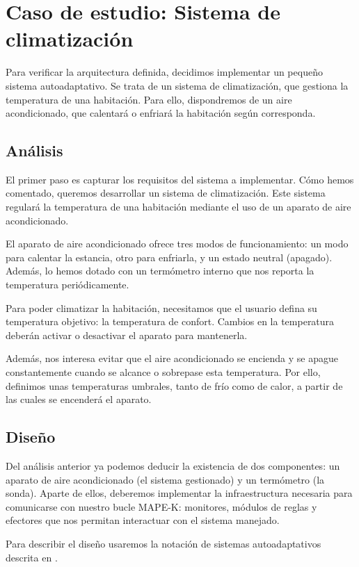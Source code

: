 \chapter{Caso de estudio: Sistema de climatización}
\label{chap:caso_estudio}

Para verificar la arquitectura definida, decidimos implementar un pequeño sistema autoadaptativo. Se trata de un sistema de climatización, que gestiona la temperatura de una habitación. Para ello, dispondremos de un aire acondicionado, que calentará o enfriará la habitación según corresponda.

\section{Análisis}

El primer paso es capturar los requisitos del sistema a implementar. Cómo hemos comentado, queremos desarrollar un sistema de climatización. Este sistema regulará la temperatura de una habitación mediante el uso de un aparato de aire acondicionado.

El aparato de aire acondicionado ofrece tres modos de funcionamiento: un modo para calentar la estancia, otro para enfriarla, y un estado neutral (apagado). Además, lo hemos dotado con un termómetro interno que nos reporta la temperatura periódicamente.

Para poder climatizar la habitación, necesitamos que el usuario defina su temperatura objetivo: la temperatura de confort. Cambios en la temperatura deberán activar o desactivar el aparato para mantenerla.

Además, nos interesa evitar que el aire acondicionado se encienda y se apague constantemente cuando se alcance o sobrepase esta temperatura. Por ello, definimos unas temperaturas umbrales, tanto de frío como de calor, a partir de las cuales se encenderá el aparato.

\section{Diseño}

Del análisis anterior ya podemos deducir la existencia de dos componentes: un aparato de aire acondicionado (el sistema gestionado) y un termómetro (la sonda). Aparte de ellos, deberemos implementar la infraestructura necesaria para comunicarse con nuestro bucle MAPE-K: monitores, módulos de reglas y efectores que nos permitan interactuar con el sistema manejado.

Para describir el diseño usaremos la notación de sistemas autoadaptativos descrita en \cite{fonsEspecificacionSistemasAutoadaptativos2021}.

